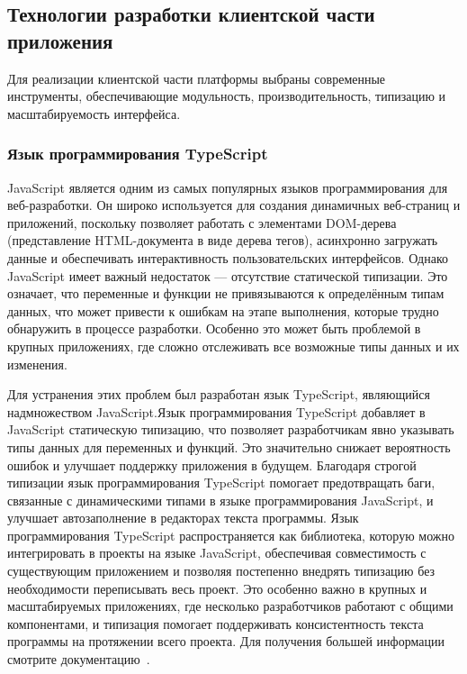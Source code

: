 \subsection{Технологии разработки клиентской части приложения}

Для реализации клиентской части платформы выбраны современные инструменты, обеспечивающие модульность, производительность, типизацию и масштабируемость интерфейса.

\subsubsection{Язык программирования TypeScript}

JavaScript является одним из самых популярных языков программирования для веб-разработки. Он широко используется для создания динамичных веб-страниц и приложений, поскольку позволяет работать с элементами DOM-дерева (представление HTML-документа в виде дерева тегов), асинхронно загружать данные и обеспечивать интерактивность пользовательских интерфейсов. Однако JavaScript имеет важный недостаток — отсутствие статической типизации. Это означает, что переменные и функции не привязываются к определённым типам данных, что может привести к ошибкам на этапе выполнения, которые трудно обнаружить в процессе разработки. Особенно это может быть проблемой в крупных приложениях, где сложно отслеживать все возможные типы данных и их изменения.

Для устранения этих проблем был разработан язык TypeScript, являющийся надмножеством JavaScript.Язык программирования TypeScript добавляет в JavaScript статическую типизацию, что позволяет разработчикам явно указывать типы данных для переменных и функций. Это значительно снижает вероятность ошибок и улучшает поддержку приложения в будущем. Благодаря строгой типизации язык программирования TypeScript помогает предотвращать баги, связанные с динамическими типами в языке программирования JavaScript, и улучшает автозаполнение в редакторах текста программы. Язык программирования TypeScript распространяется как библиотека, которую можно интегрировать в проекты на языке JavaScript, обеспечивая совместимость с существующим приложением и позволяя постепенно внедрять типизацию без необходимости переписывать весь проект. Это особенно важно в крупных и масштабируемых приложениях, где несколько разработчиков работают с общими компонентами, и типизация помогает поддерживать консистентность текста программы на протяжении всего проекта. Для получения большей информации смотрите документацию~\cite{typescript_handbook}.

